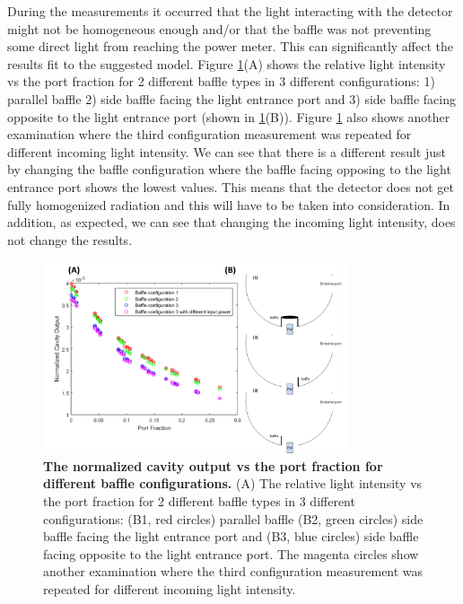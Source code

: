 \documentclass[a4paper]{article}
\begin{document}
During the measurements it occurred that the light interacting with the detector might not be homogeneous enough and/or that the baffle was not preventing some direct light from reaching the power meter. This can significantly affect the results fit to the suggested model. Figure \ref{fig:baffles_full}(A) shows the relative light intensity vs the port fraction for 2 different baffle types in 3 different configurations: 1) parallel baffle 2) side baffle facing the light entrance port and 3) side baffle facing opposite to the light entrance port (shown in \ref{fig:baffles_full}(B)). Figure \ref{fig:baffles_full} also shows another examination where the third configuration measurement was repeated for different incoming light intensity. We can see that there is a different result just by changing the baffle configuration where the baffle facing opposing to the light entrance port shows the lowest values. This means that the detector does not get fully homogenized radiation and this will have to be taken into consideration. In addition, as expected, we can see that changing the incoming light intensity, does not change the results.

\begin{figure}
\centering
\includegraphics[width=0.8\textwidth]{figures/baffles_full.png}
\caption{\textbf{The normalized cavity output vs the port fraction for different baffle configurations.} (A) The relative light intensity vs the port fraction for 2 different baffle types in 3 different configurations: (B1, red circles) parallel baffle (B2, green circles) side baffle facing the light entrance port and (B3, blue circles) side baffle facing opposite to the light entrance port. The magenta circles show another examination where the third configuration measurement was repeated for different incoming light intensity.}
\label{fig:baffles_full}
\end{figure}
\end{document}
